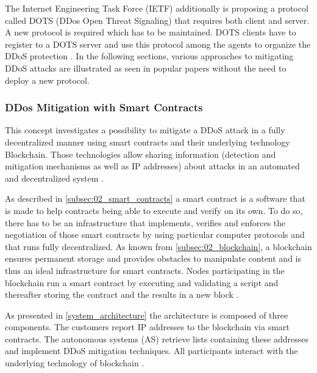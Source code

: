 The Internet Engineering Task Force (IETF) additionally is proposing a protocol called DOTS (DDos Open Threat Signaling) that requires both client and server. A new protocol is required which has to be maintained. DOTS clients have to register to a DOTS server and use this protocol among the agents to organize the DDoS protection \cite{Rodrigues2017}. In the following sections, various approaches to mitigating DDoS attacks are illustrated as seen in popular papers without the need to deploy a new protocol.

\subsubsection{DDos Mitigation with Smart Contracts}
This concept investigates a possibility to mitigate a DDoS attack in a fully decentralized manner using smart contracts and their underlying technology Blockchain. Those technologies allow sharing information (detection and mitigation mechanisms as well as IP addresses) about attacks in an automated and decentralized system \cite{Rodrigues2017}.

As described in \ref{subsec:02_smart_contracts} a smart contract is a software that is made to help contracts being able to execute and verify on its own. To do so, there has to be an infrastructure that implements, verifies and enforces the negotiation of those smart contracts by using particular computer protocols and that runs fully decentralized. As known from \ref{subsec:02_blockchain}, a blockchain ensures permanent storage and provides obstacles to manipulate content and is thus an ideal infrastructure for smart contracts. Nodes participating in the blockchain run a smart contract by executing and validating a script and thereafter storing the contract and the results in a new block \cite{Rodrigues2017}.

As presented in \ref{system_architecture} the architecture is composed of three components. The customers report IP addresses to the blockchain via smart contracts. The autonomous systems (AS) retrieve lists containing these addresses and implement DDoS mitigation techniques. All participants interact with the underlying technology of blockchain \cite{Rodrigues2017}.

